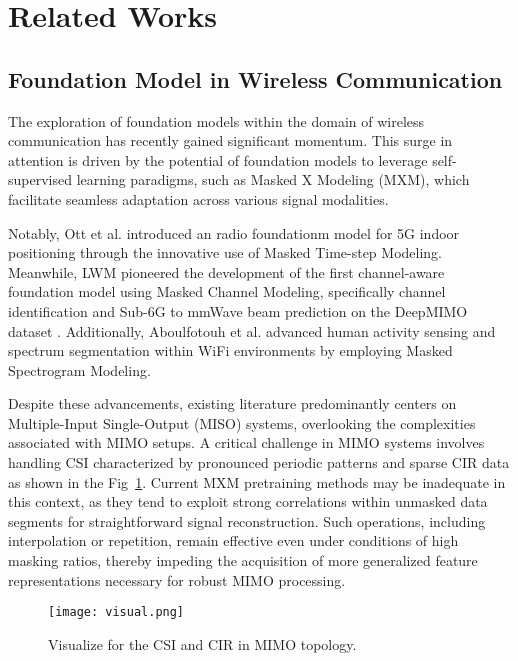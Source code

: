 \section{Related Works}
\label{sec:related works}

\subsection{Foundation Model in Wireless Communication}
The exploration of foundation models within the domain of wireless communication has recently gained significant momentum. This surge in attention is driven by the potential of foundation models to leverage self-supervised learning paradigms, such as Masked X Modeling (MXM), which facilitate seamless adaptation across various signal modalities.

Notably, Ott et al. \cite{ott2024radio} introduced an radio foundationm model for 5G indoor positioning through the innovative use of Masked Time-step Modeling. Meanwhile, LWM \cite{lwm} pioneered the development of the first channel-aware foundation model using Masked Channel Modeling, specifically channel identification and Sub-6G to mmWave beam prediction on the DeepMIMO dataset \cite{deepmimo}. Additionally, Aboulfotouh et al. \cite{MSM} advanced human activity sensing and spectrum segmentation within WiFi environments by employing Masked Spectrogram Modeling.

Despite these advancements, existing literature predominantly centers on Multiple-Input Single-Output (MISO) systems, overlooking the complexities associated with MIMO setups. A critical challenge in MIMO systems involves handling CSI characterized by pronounced periodic patterns and sparse CIR data as shown in the Fig~\ref{fig:visual}. Current MXM pretraining methods may be inadequate in this context, as they tend to exploit strong correlations within unmasked data segments for straightforward signal reconstruction. Such operations, including interpolation or repetition, remain effective even under conditions of high masking ratios, thereby impeding the acquisition of more generalized feature representations necessary for robust MIMO processing.

\begin{figure}[t]
\centering\texttt{[image: visual.png]}
\caption{Visualize for the CSI and CIR in MIMO topology.}
\label{fig:visual}
\end{figure}




